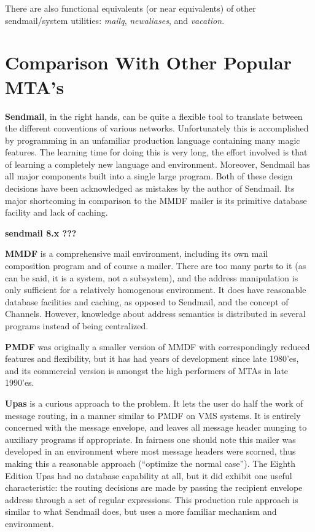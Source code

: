 There are also functional equivalents (or near equivalents) of
other sendmail/system utilities:
{\em mailq}, {\em newaliases}, and {\em vacation}.



\section{Comparison With Other Popular MTA's}

{\bf Sendmail}, in the right hands, can be quite a flexible tool to translate
between the different conventions of various networks.  Unfortunately this
is accomplished by programming in an unfamiliar production language
containing many magic features.  The learning time for doing this is very
long, the effort involved is that of learning a completely new language and
environment. Moreover, Sendmail has all major components built into a
single large program. Both of these design decisions have been acknowledged
as mistakes by the author of Sendmail.  Its major shortcoming in comparison
to the MMDF mailer is its primitive database facility and lack of caching.

{\bf sendmail 8.x ???}


{\bf MMDF} is a comprehensive mail environment, including its own mail
composition program and of course a mailer.  There are too many parts to it
(as can be said, it is a system, not a subsystem), and the address
manipulation is only sufficient for a relatively homogenous environment. It
does have reasonable database facilities and caching, as opposed to
Sendmail, and the concept of Channels.  However, knowledge about address
semantics is distributed in several programs instead of being centralized.

{\bf PMDF} was originally a smaller version of MMDF with correspondingly
reduced features and flexibility, but it has had years of development
since late 1980'es, and its commercial version is amongst the high
performers of MTAs in late 1990'es.

{\bf Upas} is a curious approach to the problem. It lets the user do half the
work of message routing, in a manner similar to PMDF on VMS systems. It is
entirely concerned with the message envelope, and leaves all message header
munging to auxiliary programs if appropriate. In fairness one should note
this mailer was developed in an environment where most message headers were
scorned, thus making this a reasonable approach (``optimize the normal
case''). The Eighth Edition Upas had no database capability at all, but it
did exhibit one useful characteristic: the routing decisions are made by
passing the recipient envelope address through a set of regular
expressions. This production rule approach is similar to what Sendmail
does, but uses a more familiar mechanism and environment.

